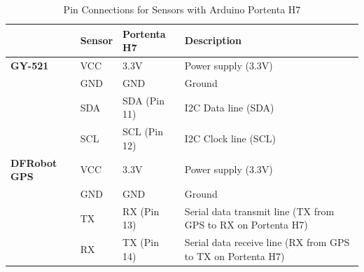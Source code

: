 \begin{table}[h!]
    \centering
    \begin{tabular}{|l|l|l|p{8cm}|}
    \hline
    \textbf{}         & \textbf{Sensor}       & \textbf{Portenta H7}            & \textbf{Description}                                                    \\ \hline
    \textbf{GY-521}         & VCC                   & 3.3V                            & Power supply (3.3V)                                                     \\ \cline{2-4}
                            & GND                   & GND                             & Ground                                                                  \\ \cline{2-4}
                            & SDA                   & SDA (Pin 11)                    & I2C Data line (SDA)                                                     \\ \cline{2-4}
                            & SCL                   & SCL (Pin 12)                    & I2C Clock line (SCL)                                                    \\ \hline
    \textbf{DFRobot GPS}    & VCC                   & 3.3V                            & Power supply (3.3V)                                                     \\ \cline{2-4}
                            & GND                   & GND                             & Ground                                                                  \\ \cline{2-4}
                            & TX                    & RX (Pin 13)                     & Serial data transmit line \newline (TX from GPS to RX on Portenta H7)   \\ \cline{2-4}
                            & RX                    & TX (Pin 14)                     & Serial data receive line \newline (RX from GPS to TX on Portenta H7)    \\ \hline
    \end{tabular}
    \caption{Pin Connections for Sensors with Arduino Portenta H7}
    \label{tab:sensor_connections}
    \end{table}